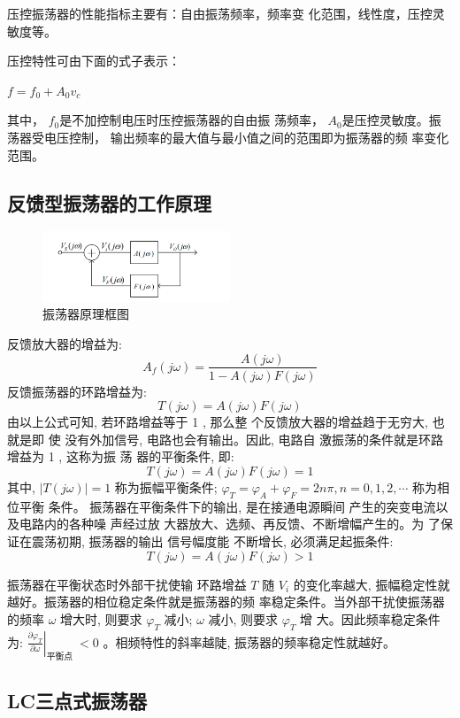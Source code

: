 \documentclass{../source/Experiment}
\begin{document}
        压控振荡器的性能指标主要有：自由振荡频率，频率变
        化范围，线性度，压控灵敏度等。

        压控特性可由下面的式子表示：

        $f = f_0 + A_0v_c$


        其中， $f_0$是不加控制电压时压控振荡器的自由振
        荡频率， $A_0 $是压控灵敏度。振荡器受电压控制，
        输出频率的最大值与最小值之间的范围即为振荡器的频
        率变化范围。

        \subsection{反馈型振荡器的工作原理}
        \begin{figure}[H]
            \centering
            \includegraphics[width = 0.5\textwidth]{lab3/2.png}
            \caption{振荡器原理框图}    
        \end{figure}
反馈放大器的增益为:
$$
A_{f}(j \omega)=\frac{A(j \omega)}{1-A(j \omega) F(j \omega)}
$$
反馈振荡器的环路增益为:
$$
T(j \omega)=A(j \omega) F(j \omega)
$$
由以上公式可知, 若环路增益等于 1 , 那么整
个反馈放大器的增益趋于无穷大, 也就是即 使
没有外加信号, 电路也会有输出。因此, 电路自
激振荡的条件就是环路增益为 1 , 这称为振 荡
器的平衡条件, 即:
$$
T(j \omega)=A(j \omega) F(j \omega)=1
$$
其中, $|T(j \omega)|=1$ 称为振幅平衡条件; $\varphi_{T}=\varphi_{A}+\varphi_{F}=2 n \pi, n=0,1,2, \cdots$ 称为相位平衡 条件。
振荡器在平衡条件下的输出, 是在接通电源瞬间
产生的突变电流以及电路内的各种噪 声经过放
大器放大、选频、再反馈、不断增幅产生的。为
了保证在震荡初期, 振荡器的输出 信号幅度能
不断增长, 必须满足起振条件:
$$
T(j \omega)=A(j \omega) F(j \omega)>1
$$

振荡器在平衡状态时外部干扰使输
环路增益 $T$ 随 $V_{i}$ 的变化率越大, 振幅稳定性就越好。振荡器的相位稳定条件就是振荡器的频 率稳定条件。当外部干扰使振荡器的频率 $\omega$ 增大时, 则要求 $\varphi_{T}$ 减小; $\omega$ 减小, 则要求 $\varphi_{T}$ 增 大。因此频率稳定条件为: $\left.\frac{\partial \varphi_{T}}{\partial \omega}\right|_{\text {平衡点 }}<0$ 。相频特性的斜率越陡, 振荡器的频率稳定性就越好。

        \subsection{LC三点式振荡器}
\end{document}
